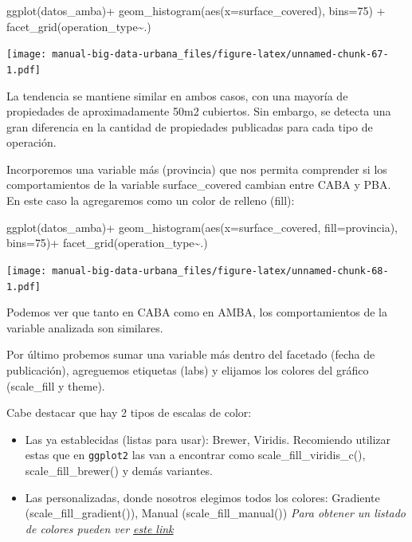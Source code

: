 \documentclass[
  spanish,
]{book}
\newenvironment{Shaded}{\begin{snugshade}}{\end{snugshade}}
\newcommand{\AttributeTok}[1]{\textcolor[rgb]{0.77,0.63,0.00}{#1}}
\newcommand{\DecValTok}[1]{\textcolor[rgb]{0.00,0.00,0.81}{#1}}
\newcommand{\FunctionTok}[1]{\textcolor[rgb]{0.00,0.00,0.00}{#1}}
\newcommand{\NormalTok}[1]{#1}
\newcommand{\SpecialCharTok}[1]{\textcolor[rgb]{0.00,0.00,0.00}{#1}}
\begin{document}
\begin{Shaded}
\begin{Highlighting}[]
\FunctionTok{ggplot}\NormalTok{(datos\_amba)}\SpecialCharTok{+}
  \FunctionTok{geom\_histogram}\NormalTok{(}\FunctionTok{aes}\NormalTok{(}\AttributeTok{x=}\NormalTok{surface\_covered), }\AttributeTok{bins=}\DecValTok{75}\NormalTok{) }\SpecialCharTok{+}
  \FunctionTok{facet\_grid}\NormalTok{(operation\_type}\SpecialCharTok{\textasciitilde{}}\NormalTok{.)}
\end{Highlighting}
\end{Shaded}

\texttt{[image: manual-big-data-urbana\_files/figure-latex/unnamed-chunk-67-1.pdf]}

La tendencia se mantiene similar en ambos casos, con una mayoría de propiedades de aproximadamente 50m2 cubiertos. Sin embargo, se detecta una gran diferencia en la cantidad de propiedades publicadas para cada tipo de operación.

Incorporemos una variable más (provincia) que nos permita comprender si los comportamientos de la variable surface\_covered cambian entre CABA y PBA. En este caso la agregaremos como un color de relleno (fill):

\begin{Shaded}
\begin{Highlighting}[]
\FunctionTok{ggplot}\NormalTok{(datos\_amba)}\SpecialCharTok{+}
  \FunctionTok{geom\_histogram}\NormalTok{(}\FunctionTok{aes}\NormalTok{(}\AttributeTok{x=}\NormalTok{surface\_covered, }\AttributeTok{fill=}\NormalTok{provincia), }\AttributeTok{bins=}\DecValTok{75}\NormalTok{)}\SpecialCharTok{+}
  \FunctionTok{facet\_grid}\NormalTok{(operation\_type}\SpecialCharTok{\textasciitilde{}}\NormalTok{.)}
\end{Highlighting}
\end{Shaded}

\texttt{[image: manual-big-data-urbana\_files/figure-latex/unnamed-chunk-68-1.pdf]}

Podemos ver que tanto en CABA como en AMBA, los comportamientos de la variable analizada son similares.

Por último probemos sumar una variable más dentro del facetado (fecha de publicación), agreguemos etiquetas (labs) y elijamos los colores del gráfico (scale\_fill y theme).

Cabe destacar que hay 2 tipos de escalas de color:

\begin{itemize}
\item
  Las ya establecidas (listas para usar): Brewer, Viridis. Recomiendo utilizar estas que en \texttt{ggplot2} las van a encontrar como scale\_fill\_viridis\_c(), scale\_fill\_brewer() y demás variantes.
\item
  Las personalizadas, donde nosotros elegimos todos los colores: Gradiente (scale\_fill\_gradient()), Manual (scale\_fill\_manual())
  \emph{Para obtener un listado de colores pueden ver \href{http://www.stat.columbia.edu/~tzheng/files/Rcolor.pdf}{este link}}
\end{itemize}
\end{document}
